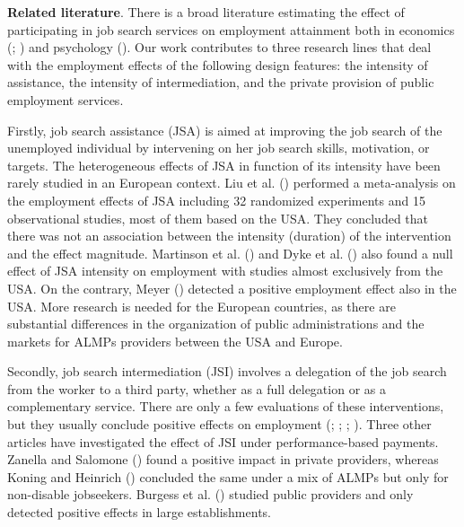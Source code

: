\documentclass[
  11pt]{article}
\begin{document}
\textbf{Related literature}. There is a broad literature estimating the
effect of participating in job search services on employment attainment
both in economics (;
) and psychology
(). Our work contributes to
three research lines that deal with the employment effects of the
following design features: the intensity of assistance, the intensity of
intermediation, and the private provision of public employment services.

Firstly, job search assistance (JSA) is aimed at improving the job
search of the unemployed individual by intervening on her job search
skills, motivation, or targets. The heterogeneous effects of JSA in
function of its intensity have been rarely studied in an European
context. Liu et al. () performed a
meta-analysis on the employment effects of JSA including 32 randomized
experiments and 15 observational studies, most of them based on the USA.
They concluded that there was not an association between the intensity
(duration) of the intervention and the effect magnitude. Martinson et
al. () and Dyke et al.
() also found a null effect of JSA
intensity on employment with studies almost exclusively from the USA. On
the contrary, Meyer () detected a positive
employment effect also in the USA. More research is needed for the
European countries, as there are substantial differences in the
organization of public administrations and the markets for ALMPs
providers between the USA and Europe.

Secondly, job search intermediation (JSI) involves a delegation of the
job search from the worker to a third party, whether as a full
delegation or as a complementary service. There are only a few
evaluations of these interventions, but they usually conclude positive
effects on employment (; ;
;
). Three other articles
have investigated the effect of JSI under performance-based payments.
Zanella and Salomone () found a
positive impact in private providers, whereas Koning and Heinrich
() concluded the same under a mix
of ALMPs but only for non-disable jobseekers. Burgess et al.
() studied public providers and only
detected positive effects in large establishments.
\end{document}

